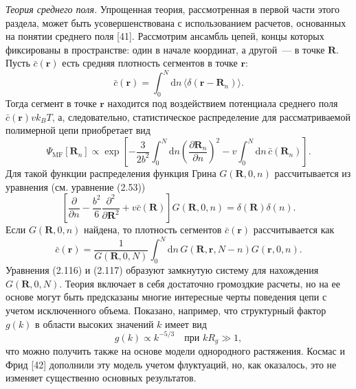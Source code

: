 \documentclass[12pt,a4paper]{article}
\begin{document}
\textit{Теория среднего поля.} Упрощенная теория, рассмотренная в первой части этого раздела, может быть усовершенствована с использованием расчетов, основанных на понятии среднего поля [41]. Рассмотрим ансамбль цепей, концы которых фиксированы в пространстве: один в начале координат, а другой~--- в точке $\boldsymbol{R}$. Пусть $\bar{c}(\boldsymbol{r})$ есть средняя плотность сегментов в точке $\boldsymbol{r}$:
\begin{equation}
\bar{c}(\boldsymbol{r}) = \int_0^N\!\mathrm{d}n\,\langle\delta(\boldsymbol{r} - \boldsymbol{R}_n)\rangle. \tag{2.114}
\end{equation}
Тогда сегмент в точке $\boldsymbol{r}$ находится под воздействием потенциала среднего поля $\bar{c}(\boldsymbol{r})vk_B T$, а, следовательно, статистическое распределение для рассматриваемой полимерной цепи приобретает вид
\begin{equation}
\Psi_{\mathrm{MF}}[\boldsymbol{R}_n] \propto \exp\left[-\frac{3}{2b^2}\int_0^N\!\mathrm{d}n\left(\frac{\partial\boldsymbol{R}_n}{\partial n}\right)^2 - v\int_0^N\!\mathrm{d}n\,\bar{c}(\boldsymbol{R}_n)\right]. \tag{2.115}
\end{equation}
Для такой функции распределения функция Грина $G(\boldsymbol{R}, 0, n)$ рассчитывается из уравнения (см. уравнение (2.53))
\begin{equation}
\left[\frac{\partial}{\partial n} - \frac{b^2}{6}\frac{\partial^2}{\partial\boldsymbol{R}^2} + v\bar{c}(\boldsymbol{R})\right]G(\boldsymbol{R}, 0, n) = \delta(\boldsymbol{R})\delta(n). \tag{2.116}
\end{equation}
Если $G(\boldsymbol{R}, 0, n)$ найдена, то плотность сегментов $\bar{c}(\boldsymbol{r})$ рассчитывается как
\begin{equation}
\bar{c}(\boldsymbol{r}) = \frac{1}{G(\boldsymbol{R}, 0, N)}\int_0^N\!\mathrm{d}n\,G(\boldsymbol{R}, \boldsymbol{r}, N - n)G(\boldsymbol{r}, 0, n). \tag{2.117}
\end{equation}
Уравнения (2.116) и (2.117) образуют замкнутую систему для нахождения $G(\boldsymbol{R}, 0, N)$. Теория включает в себя достаточно громоздкие расчеты, но на ее основе могут быть предсказаны многие интересные черты поведения цепи с учетом исключенного объема. Показано, например, что структурный фактор $g(k)$ в области высоких значений $k$ имеет вид
\begin{equation}
g(k) \propto k^{-5/3} \quad \text{при } kR_g \gg 1, \tag{2.118}
\end{equation}
что можно получить также на основе модели однородного растяжения. Космас и Фрид [42] дополнили эту модель учетом флуктуаций, но, как оказалось, это не изменяет существенно основных результатов.
\end{document}
